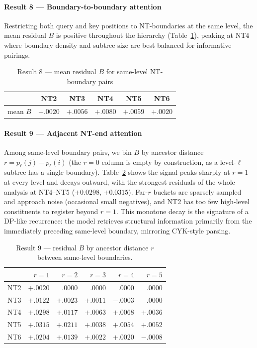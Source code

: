 \documentclass[10pt,twocolumn]{article}
\begin{document}
\paragraph{Result 8 — Boundary-to-boundary attention}
Restricting both query and key positions to NT-boundaries at the same level, the mean residual $B$ is positive throughout the hierarchy (Table~\ref{tab:r8}), peaking at NT4 where boundary density and subtree size are best balanced for informative pairings.

\begin{table}[h]
\centering
\caption{Result 8 — mean residual $B$ for same-level NT-boundary pairs}
\label{tab:r8}
\setlength{\tabcolsep}{4pt}
\small
\begin{tabular}{lccccc}
\toprule
& NT2 & NT3 & NT4 & NT5 & NT6 \\
\midrule
mean $B$ & $+.0020$ & $+.0056$ & $\mathbf{+.0080}$ & $+.0059$ & $+.0020$ \\
\bottomrule
\end{tabular}
\end{table}

\paragraph{Result 9 — Adjacent NT-end attention}
Among same-level boundary pairs, we bin $B$ by ancestor distance $r=p_\ell(j)-p_\ell(i)$ (the $r{=}0$ column is empty by construction, as a level-$\ell$ subtree has a single boundary). Table~\ref{tab:r9} shows the signal peaks sharply at $r=1$ at every level and decays outward, with the strongest residuals of the whole analysis at NT4--NT5 ($+0.0298$, $+0.0315$). Far-$r$ buckets are sparsely sampled and approach noise (occasional small negatives), and NT2 has too few high-level constituents to register beyond $r=1$. This monotone decay is the signature of a DP-like recurrence: the model retrieves structural information primarily from the immediately preceding same-level boundary, mirroring CYK-style parsing.

\begin{table}[h]
\centering
\caption{Result 9 — residual $B$ by ancestor distance $r$ between same-level boundaries.}
\label{tab:r9}
\setlength{\tabcolsep}{4pt}
\small
\begin{tabular}{lrrrrr}
\toprule
& $r{=}1$ & $r{=}2$ & $r{=}3$ & $r{=}4$ & $r{=}5$ \\
\midrule
NT2 & $+.0020$ & $.0000$  & $.0000$  & $.0000$  & $.0000$  \\
NT3 & $+.0122$ & $+.0023$ & $+.0011$ & $-.0003$ & $.0000$  \\
NT4 & $\mathbf{+.0298}$ & $+.0117$ & $+.0063$ & $+.0068$ & $+.0036$ \\
NT5 & $\mathbf{+.0315}$ & $+.0211$ & $+.0038$ & $+.0054$ & $+.0052$ \\
NT6 & $+.0204$ & $+.0139$ & $+.0022$ & $+.0020$ & $-.0008$ \\
\bottomrule
\end{tabular}
\end{table}
\end{document}
